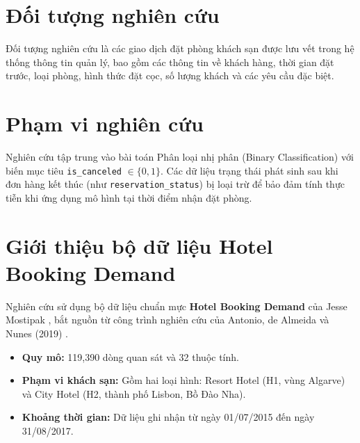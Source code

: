 \section{Đối tượng nghiên cứu}
Đối tượng nghiên cứu là các giao dịch đặt phòng khách sạn được lưu vết trong hệ thống thông tin quản lý, bao gồm các thông tin về khách hàng, thời gian đặt trước, loại phòng, hình thức đặt cọc, số lượng khách và các yêu cầu đặc biệt.

\section{Phạm vi nghiên cứu}
Nghiên cứu tập trung vào bài toán Phân loại nhị phân (Binary Classification) với biến mục tiêu \texttt{is\_canceled} $\in \{0, 1\}$. Các dữ liệu trạng thái phát sinh sau khi đơn hàng kết thúc (như \texttt{reservation\_status}) bị loại trừ để bảo đảm tính thực tiễn khi ứng dụng mô hình tại thời điểm nhận đặt phòng.

\section{Giới thiệu bộ dữ liệu Hotel Booking Demand}
Nghiên cứu sử dụng bộ dữ liệu chuẩn mực \textbf{Hotel Booking Demand} của Jesse Mostipak \cite{mostipak2019kaggle}, bắt nguồn từ công trình nghiên cứu của Antonio, de Almeida và Nunes (2019) \cite{antonio2019hotel}.
\begin{itemize}
    \item \textbf{Quy mô:} 119,390 dòng quan sát và 32 thuộc tính.
    \item \textbf{Phạm vi khách sạn:} Gồm hai loại hình: Resort Hotel (H1, vùng Algarve) và City Hotel (H2, thành phố Lisbon, Bồ Đào Nha).
    \item \textbf{Khoảng thời gian:} Dữ liệu ghi nhận từ ngày 01/07/2015 đến ngày 31/08/2017.
\end{itemize}

